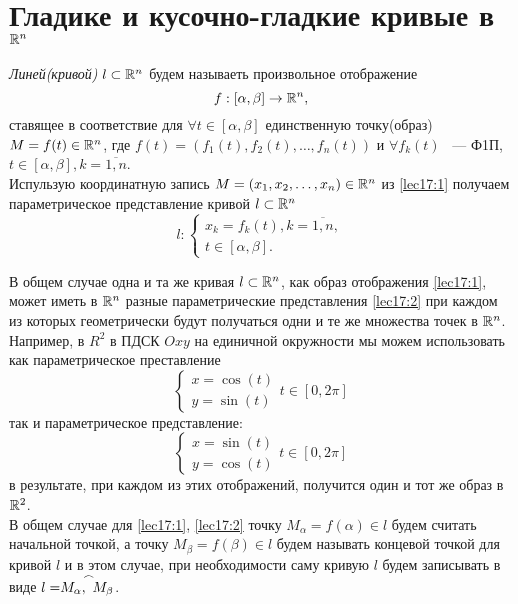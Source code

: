 \documentclass[../../main.tex]{subfiles}
\begin{document}
\section{Гладике и кусочно-гладкие кривые в $\mathbb{R}^n$}

\emph{Линей(кривой)} $l \subset \mathbb{R}^n $ будем 
называеть произвольное отображение
\begin{equation}
  \label{lec17:1}
  f: [\alpha, \beta] \to \mathbb{R}^n,
\end{equation}
ставящее в соответствие для $\forall t \in [\alpha, \beta]$ 
единственную точку(образ) $M = f(t) \in \mathbb{R}^n$,
где $f(t) = (f_1(t), f_2(t), \ldots, f_n(t))$ и
$\forall f_k(t)$ ~--- Ф1П, $t \in [\alpha, \beta], k = \overline{1,n}$.\\
Испульзую координатную запись
$M = (x_1, x_2, \ldots, x_n) \in \mathbb{R}^n$ из \eqref{lec17:1} 
получаем параметрическое представление кривой $l \subset \mathbb{R}^n$
\begin{equation}
 \label{lec17:2}
 l: 
 \left\{
  \begin{array}{cc}
    x_k = f_k(t), k = \overline{1,n},\\
    t \in \left[\alpha, \beta\right].
  \end{array}
 \right.
\end{equation}

В общем случае одна и та же кривая $l \subset \mathbb{R}^n$, 
как образ отображения \eqref{lec17:1}, может иметь в $\mathbb{R}^n$ разные
параметрические представления \eqref{lec17:2} при каждом из которых 
геометрически 
будут получаться одни и те же множества точек в $\mathbb{R}^n$.\\
Например, в $R^2$ в ПДСК  $Oxy$ на единичной окружности мы можем 
использовать как параметрическое преставление
\[
\left\{
  \begin{array}{cc}
    x = \cos(t) \\
    y = \sin(t)
  \end{array}
  \right.
  t \in \left[0, 2\pi \right]
\] 
так и параметрическое представление:
\[
\left\{
  \begin{array}{cc}
    x = \sin(t) \\
    y = \cos(t)
  \end{array}
  \right.
  t \in \left[0, 2\pi \right]
\] 
в результате, при каждом из этих отображений, 
получится один и тот же образ в $\mathbb{R}^2$.\\
В общем случае для \eqref{lec17:1}, \eqref{lec17:2}
точку $M_\alpha = f(\alpha) \in l$ будем считать начальной точкой,
а точку $M_\beta = f(\beta) \in l$ будем называть концевой точкой для кривой 
$l$ и в этом случае, при необходимости саму кривую $l$ будем записывать в виде
$l = \buildrel\,\,\frown\over{M_\alpha,\ M_\beta}$.
\end{document}

